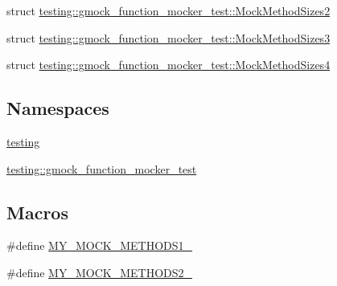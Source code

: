 \begin{DoxyCompactItemize}
\item 
struct \mbox{\hyperlink{structtesting_1_1gmock__function__mocker__test_1_1_mock_method_sizes2}{testing\+::gmock\+\_\+function\+\_\+mocker\+\_\+test\+::\+Mock\+Method\+Sizes2}}
\item 
struct \mbox{\hyperlink{structtesting_1_1gmock__function__mocker__test_1_1_mock_method_sizes3}{testing\+::gmock\+\_\+function\+\_\+mocker\+\_\+test\+::\+Mock\+Method\+Sizes3}}
\item 
struct \mbox{\hyperlink{structtesting_1_1gmock__function__mocker__test_1_1_mock_method_sizes4}{testing\+::gmock\+\_\+function\+\_\+mocker\+\_\+test\+::\+Mock\+Method\+Sizes4}}
\end{DoxyCompactItemize}
\subsection*{Namespaces}
\begin{DoxyCompactItemize}
\item 
 \mbox{\hyperlink{namespacetesting}{testing}}
\item 
 \mbox{\hyperlink{namespacetesting_1_1gmock__function__mocker__test}{testing\+::gmock\+\_\+function\+\_\+mocker\+\_\+test}}
\end{DoxyCompactItemize}
\subsection*{Macros}
\begin{DoxyCompactItemize}
\item 
\#define \mbox{\hyperlink{_obj__test_2lib_2googletest-master_2googlemock_2test_2gmock-function-mocker__test_8cc_a9ae68063487fddb9f678e66728fae155}{M\+Y\+\_\+\+M\+O\+C\+K\+\_\+\+M\+E\+T\+H\+O\+D\+S1\+\_\+}}
\item 
\#define \mbox{\hyperlink{_obj__test_2lib_2googletest-master_2googlemock_2test_2gmock-function-mocker__test_8cc_ac36252ad7584222cebc036d56465d652}{M\+Y\+\_\+\+M\+O\+C\+K\+\_\+\+M\+E\+T\+H\+O\+D\+S2\+\_\+}}
\end{DoxyCompactItemize}
